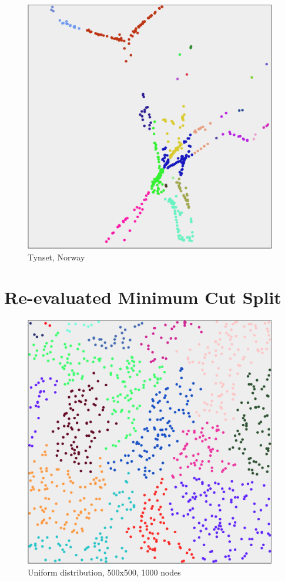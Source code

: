 \begin{appendices}
	\begin{figure}[H]
		\centering
		\includegraphics[width=11cm]{Images/computations/MINCUT_TYNSET.png}
		\caption{Tynset, Norway}
	\end{figure}


	\section{Re-evaluated Minimum Cut Split}
	\label{appendix:mincutsplittwo}
	\begin{figure}
		\centering
		\includegraphics[width=11cm]{Images/computations/MINCUT2_UNI.png}
		\caption{Uniform distribution, 500x500, 1000 nodes}
	\end{figure}


\end{appendices}
